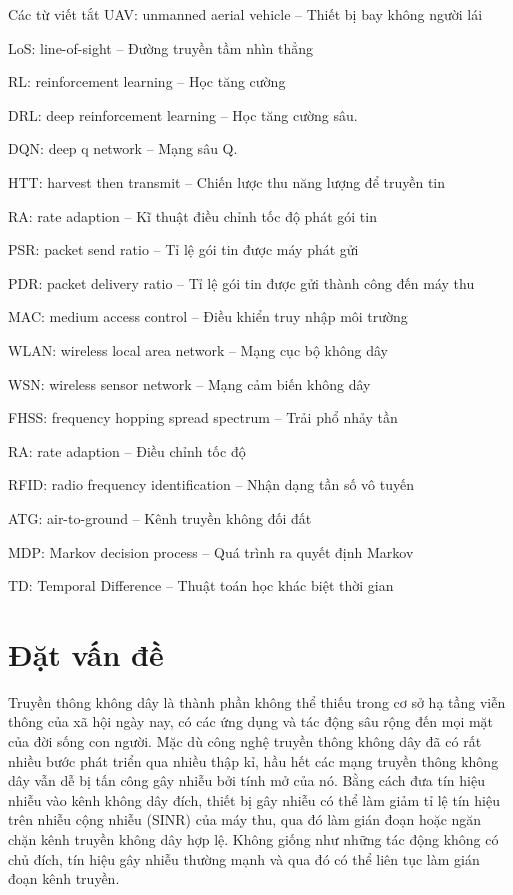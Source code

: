 \documentclass{uetgraduation}
\begin{document}
\begin{contentlisting}

\tableofcontents
\listoffigures

\begin{contentlistingsection}{Các từ viết tắt}
    UAV: unmanned aerial vehicle -- Thiết bị bay không người lái

    LoS: line-of-sight -- Đường truyền tầm nhìn thẳng

    RL: reinforcement learning -- Học tăng cường

    DRL: deep reinforcement learning -- Học tăng cường sâu.
    
    DQN: deep q network -- Mạng sâu Q.

    HTT: harvest then transmit -- Chiến lược thu năng lượng để truyền tin

    RA: rate adaption -- Kĩ thuật điều chỉnh tốc độ phát gói tin

    PSR: packet send ratio -- Tỉ lệ gói tin được máy phát gửi

    PDR: packet delivery ratio -- Tỉ lệ gói tin được gửi thành công đến máy thu

    MAC: medium access control -- Điều khiển truy nhập môi trường

    WLAN: wireless local area network -- Mạng cục bộ không dây

    WSN: wireless sensor network -- Mạng cảm biến không dây

    FHSS: frequency hopping spread spectrum -- Trải phổ nhảy tần

    RA: rate adaption -- Điều chỉnh tốc độ

    RFID: radio frequency identification -- Nhận dạng tần số vô tuyến

    ATG: air-to-ground -- Kênh truyền không đối đất

    MDP: Markov decision process -- Quá trình ra quyết định Markov

    TD: Temporal Difference -- Thuật toán học khác biệt thời gian
\end{contentlistingsection}

\end{contentlisting}

\chapter{Đặt vấn đề}
Truyền thông không dây là thành phần không thể thiếu trong cơ sở hạ tầng viễn thông của xã hội ngày nay, có các ứng dụng và
tác động sâu rộng đến mọi mặt của đời sống con người. Mặc dù công nghệ truyền thông không dây đã có rất nhiều bước phát triển
qua nhiều thập kỉ, hầu hết các mạng truyền thông không dây vẫn dễ bị tấn công gây nhiễu bởi tính mở của nó. Bằng cách đưa tín
hiệu nhiễu vào kênh không dây đích, thiết bị gây nhiễu có thể làm giảm tỉ lệ tín hiệu trên nhiễu cộng nhiễu (SINR) của máy thu,
qua đó làm gián đoạn hoặc ngăn chặn kênh truyền không dây hợp lệ. Không giống như những tác động không có chủ đích, tín hiệu gây
nhiễu thường mạnh và qua đó có thể liên tục làm gián đoạn kênh truyền.
\end{document}

